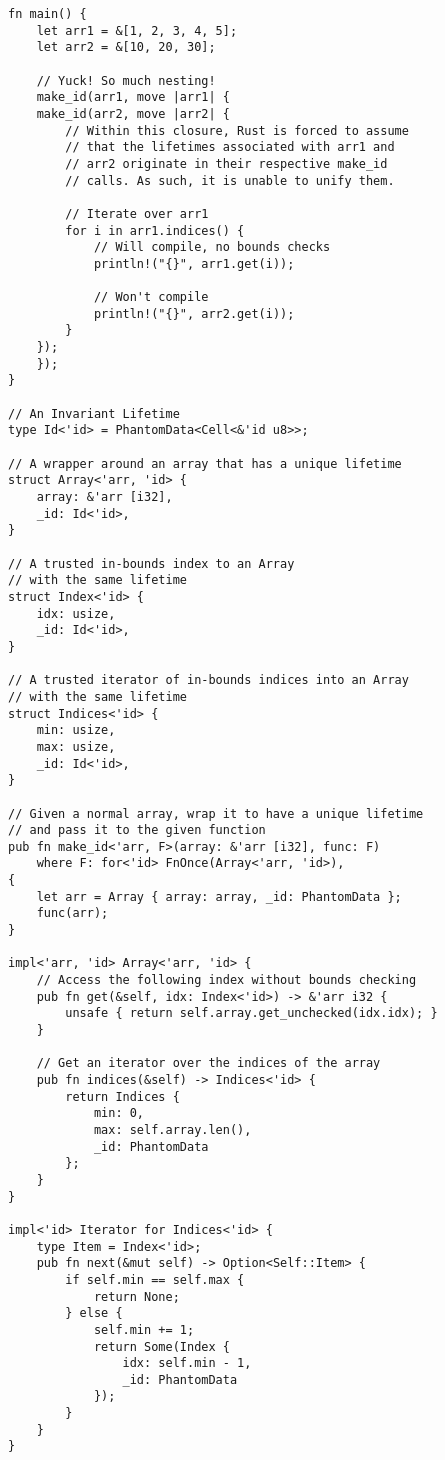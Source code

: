 \begin{verbatim}
fn main() {
    let arr1 = &[1, 2, 3, 4, 5];
    let arr2 = &[10, 20, 30];

    // Yuck! So much nesting!
    make_id(arr1, move |arr1| {
    make_id(arr2, move |arr2| {
        // Within this closure, Rust is forced to assume
        // that the lifetimes associated with arr1 and
        // arr2 originate in their respective make_id
        // calls. As such, it is unable to unify them.

        // Iterate over arr1
        for i in arr1.indices() {
            // Will compile, no bounds checks
            println!("{}", arr1.get(i));

            // Won't compile
            println!("{}", arr2.get(i));
        }
    });
    });
}

// An Invariant Lifetime
type Id<'id> = PhantomData<Cell<&'id u8>>;

// A wrapper around an array that has a unique lifetime
struct Array<'arr, 'id> {
    array: &'arr [i32],
    _id: Id<'id>,
}

// A trusted in-bounds index to an Array
// with the same lifetime
struct Index<'id> {
    idx: usize,
    _id: Id<'id>,
}

// A trusted iterator of in-bounds indices into an Array
// with the same lifetime
struct Indices<'id> {
    min: usize,
    max: usize,
    _id: Id<'id>,
}

// Given a normal array, wrap it to have a unique lifetime
// and pass it to the given function
pub fn make_id<'arr, F>(array: &'arr [i32], func: F)
    where F: for<'id> FnOnce(Array<'arr, 'id>),
{
    let arr = Array { array: array, _id: PhantomData };
    func(arr);
}

impl<'arr, 'id> Array<'arr, 'id> {
    // Access the following index without bounds checking
    pub fn get(&self, idx: Index<'id>) -> &'arr i32 {
        unsafe { return self.array.get_unchecked(idx.idx); }
    }

    // Get an iterator over the indices of the array
    pub fn indices(&self) -> Indices<'id> {
        return Indices {
            min: 0,
            max: self.array.len(),
            _id: PhantomData
        };
    }
}

impl<'id> Iterator for Indices<'id> {
    type Item = Index<'id>;
    pub fn next(&mut self) -> Option<Self::Item> {
        if self.min == self.max {
            return None;
        } else {
            self.min += 1;
            return Some(Index {
                idx: self.min - 1,
                _id: PhantomData
            });
        }
    }
}
\end{verbatim}

